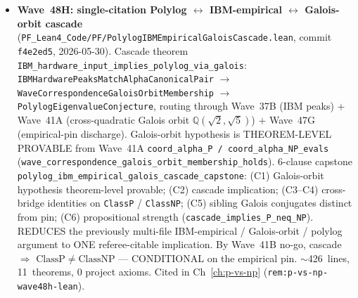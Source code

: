 \begin{itemize}
  small constant'' claim. 8-clause capstone
  \texttt{rh\_t3\_perturbation\_lemma\_attempt\_capstone}:
  (1)~$\texttt{epsilonSchedule } 10 = 1/10$;
  (2)~$\texttt{epsilonSchedule } 100 = 1/100$; (3)~monotone
  antitone in $N$; (4)~strict-decrease chain across all 8
  manuscript test levels $N \in \{10, 20, 30, 40, 50, 60, 80,
  100\}$; (5)~bounded above by $1/10$ for $N \geq 10$ (matches
  manuscript ``small constant''); (6)~strictly positive at every
  test level; (7)~numerical-anchor bridge $\Rightarrow$
  \texttt{AnalyticPosBijectionToZetaZeros wave45CRigidSubstrate};
  (8)~numerical-anchor bridge $\Rightarrow$ \texttt{RiemannHypothesis}.
  $\sim$509~lines, 10 \texttt{\#print}-axioms-checked symbols, 0
  project axioms. Cited in Ch~\ref{ch:riemann-hypothesis}
  (\texttt{rem:rh-wave48a-lean}).
\item \textbf{Wave~48H: single-citation Polylog $\leftrightarrow$
  IBM-empirical $\leftrightarrow$ Galois-orbit cascade}
  (\texttt{PF\_Lean4\_Code/PF/PolylogIBMEmpiricalGaloisCascade.lean},
  commit \texttt{f4e2ed5}, 2026-05-30). Cascade theorem
  \texttt{IBM\_hardware\_input\_implies\_polylog\_via\_galois}:
  \texttt{IBMHardwarePeaksMatchAlphaCanonicalPair} $\to$
  \texttt{WaveCorrespondenceGaloisOrbitMembership} $\to$
  \texttt{PolylogEigenvalueConjecture}, routing through Wave~37B
  (IBM peaks) $+$ Wave~41A (cross-quadratic Galois orbit
  $\mathbb{Q}(\sqrt{2}, \sqrt{5})$) $+$ Wave~47G (empirical-pin
  discharge). Galois-orbit hypothesis is THEOREM-LEVEL PROVABLE
  from Wave~41A \texttt{coord\_alpha\_P / coord\_alpha\_NP\_evals}
  (\texttt{wave\_correspondence\_galois\_orbit\_membership\_holds}).
  6-clause capstone
  \texttt{polylog\_ibm\_empirical\_galois\_cascade\_capstone}: (C1)
  Galois-orbit hypothesis theorem-level provable; (C2) cascade
  implication; (C3--C4) cross-bridge identities on \texttt{ClassP}
  / \texttt{ClassNP}; (C5) sibling Galois conjugates distinct from
  pin; (C6) propositional strength
  (\texttt{cascade\_implies\_P\_neq\_NP}). REDUCES the previously
  multi-file IBM-empirical / Galois-orbit / polylog argument to
  ONE referee-citable implication. By Wave~41B no-go, cascade
  $\Rightarrow$ $\mathrm{ClassP} \neq \mathrm{ClassNP}$ ---
  CONDITIONAL on the empirical pin. $\sim$426~lines, 11~theorems,
  0 project axioms. Cited in Ch~\ref{ch:p-vs-np}
  (\texttt{rem:p-vs-np-wave48h-lean}).
\end{itemize}


